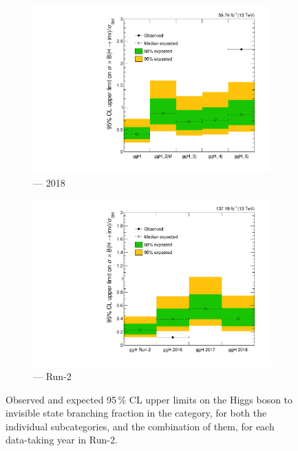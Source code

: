 \begin{figure}[htbp]
    \begin{subfigure}[b]{0.45\textwidth}
        \includegraphics[width=\textwidth]{figures/limits/ggF/limit_2018_ggF.pdf}
        \caption{\ggH --- 2018}
    \end{subfigure}
    \hfill
    \begin{subfigure}[b]{0.45\textwidth}
        \includegraphics[width=\textwidth]{figures/limits/ggF/limit_Run2_ggF.pdf}
        \caption{\ggH --- Run-2}
    \end{subfigure}
    \caption[Observed and expected 95\,\% CL upper limits on the Higgs boson to invisible state branching fraction in the \ggH category, for both the individual subcategories, and the combination of them, for each data-taking year in Run-2]{Observed and expected 95\,\% CL upper limits on the Higgs boson to invisible state branching fraction in the \ggH category, for both the individual subcategories, and the combination of them, for each data-taking year in Run-2.}
    \label{fig:htoinv_limit_ggF}
\end{figure}

